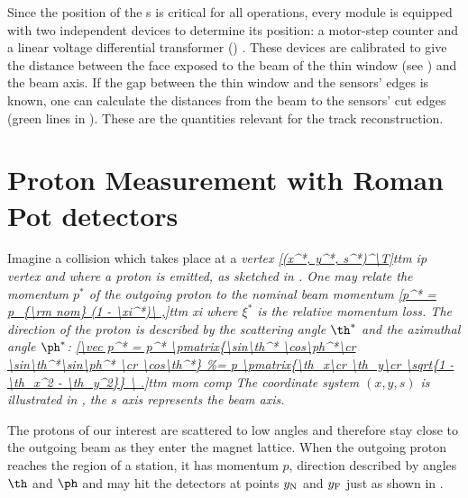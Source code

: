 Since the position of the s is critical for all  operations, every  module is equipped with two independent devices to determine its position: a motor-step counter and a linear voltage differential transformer () . These devices are calibrated to give the distance between the face exposed to the beam of the thin window (see ) and the beam axis. If the gap between the thin window and the sensors' edges is known, one can calculate the distances from the beam to the sensors' cut edges (green lines in ). These are the quantities relevant for the track reconstruction.




\section[rp measurement]{Proton Measurement with Roman Pot detectors}



Imagine a collision which takes place at a \em{vertex}
\eqref{(x^*, y^*, s^*)^\T}{ttm ip vertex}
and where a proton is emitted, as sketched in . One may relate the momentum $p^*$ of the outgoing proton to the nominal beam momentum
\eqref{p^* = p_{\rm nom} (1 - \xi^*)\ ,}{ttm xi}
where $\xi^*$ is the relative \em{momentum loss}. The direction of the proton is described by the \em{scattering angle} $\th^*$ and the \em{azimuthal angle} $\ph^*$:
\eqref{\vec p^* = p^* \pmatrix{\sin\th^* \cos\ph^*\cr \sin\th^*\sin\ph^* \cr \cos\th^*}
\ .}{ttm mom comp}
The coordinate system $(x, y, s)$ is illustrated in , the $s$ axis represents the beam axis.

The protons of our interest are scattered to low angles and therefore stay close to the outgoing beam as they enter the  magnet lattice. When the outgoing proton reaches the region of a  station, it has momentum $p$, direction described by angles $\th$ and $\ph$ and may hit the detectors at points $y_{\rm N}$ and $y_{\rm F}$ just as shown in .

